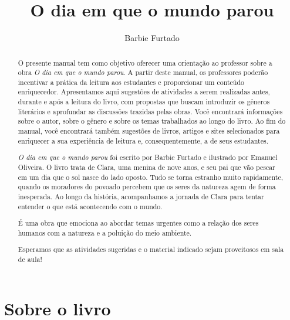 \documentclass[11pt]{extarticle}
\newcommand{\AutorLivro}{Barbie Furtado}
\newcommand{\TituloLivro}{O dia em que o mundo parou}
\newcommand{\colaborador}{Ana Lancman}
\begin{document}
\title{\TituloLivro}
\author{\AutorLivro}
\def\authornotes{\colaborador}

\date{}
\maketitle


\tableofcontents

\pagebreak

\begin{abstract}

O presente manual tem como objetivo oferecer uma orientação ao professor sobre a obra \textit{O dia em que o mundo parou}. A partir deste manual, os professores poderão incentivar a prática da leitura aos estudantes e proporcionar um conteúdo enriquecedor. Apresentamos aqui sugestões de atividades a serem realizadas antes, durante e após a leitura do livro, com propostas que buscam introduzir os gêneros literários e aprofundar as discussões trazidas pelas obras. Você encontrará informações sobre o autor, sobre o gênero e sobre os temas trabalhados ao longo do livro. Ao fim do manual, você encontrará também sugestões de livros, artigos e sites selecionados para enriquecer a sua experiência de leitura e, consequentemente, a de seus estudantes.

\textit{O dia em que o mundo parou} foi escrito por Barbie Furtado e ilustrado por Emanuel Oliveira. O livro trata de Clara, uma menina de nove anos, e seu pai que vão pescar em um dia que o sol nasce do lado oposto. Tudo se torna estranho muito rapidamente, quando os moradores do povoado percebem que os seres da natureza agem de forma inesperada. Ao longo da história, acompanhamos a jornada de Clara para tentar entender o que está acontecendo com o mundo.

É uma obra que emociona ao abordar temas urgentes como a relação dos seres humanos com a natureza e a poluição do meio ambiente. 

Esperamos que as atividades sugeridas e o material indicado sejam proveitosos em sala de aula! 

\end{abstract}


\section{Sobre o livro}
\end{document}
